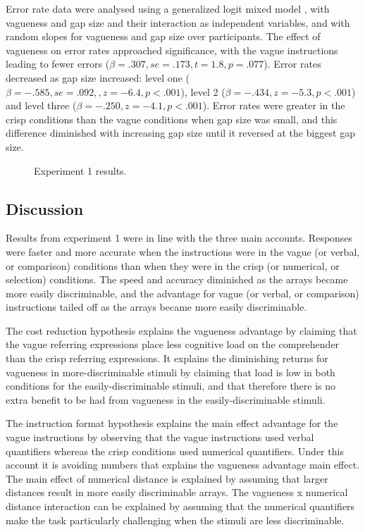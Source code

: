 \documentclass[
a4paper 
, doc
, longtable
]{apa6}
\begin{document}
\label{accann}
Error rate data were analysed using a generalized logit mixed model \cite{jaeger2008categorical}, with vagueness and gap size and their interaction as independent variables, and with random slopes for vagueness and gap size over participants. 
%
The effect of vagueness on error rates approached significance, with the vague instructions leading to fewer errors ($\beta=.307, se=.173, t=1.8, p=.077$).
%
Error rates decreased as gap size increased: level one ($\beta=-.585, se=.092, ,z=-6.4, p<.001$), level 2 ($\beta=-.434, z=-5.3,p<.001$) and level three ($\beta=-.250,z=-4.1, p<.001$). 
%
Error rates were greater in the crisp conditions than the vague conditions when gap size was small, and this difference diminished with increasing gap size until it reversed at the biggest gap size.
\begin{figure}[htbp]
\caption{Experiment 1 results. }
\label{resultse1}
\end{figure}

\subsection{Discussion}

Results from experiment 1 were in line with the three main accounts. Responses were faster and more accurate when the instructions were in the vague (or verbal, or comparison) conditions than when they were in the crisp (or numerical, or selection) conditions. The speed and accuracy diminished as the arrays became more easily discriminable, and the advantage for vague (or verbal, or comparison) instructions tailed off as the arrays became more easily discriminable.

The cost reduction hypothesis explains the vagueness advantage by claiming that the vague referring expressions place less cognitive load on the comprehender than the crisp referring expressions. It explains the diminishing returns for vagueness in more-discriminable stimuli by claiming that load is low in both conditions for the easily-discriminable stimuli, and that therefore there is no extra benefit to be had from vagueness in the easily-discriminable stimuli. 

The instruction format hypothesis explains the main effect advantage for the vague instructions by observing that the vague instructions used verbal quantifiers whereas the crisp conditions used numerical quantifiers. Under this account it is avoiding numbers that explains the vagueness advantage main effect. The main effect of numerical distance is explained by assuming that larger distances result in more easily discriminable arrays. The vagueness x numerical distance interaction can be explained by assuming that the numerical quantifiers make the task particularly challenging when the stimuli are less discriminable.
\end{document}
